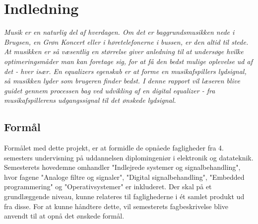 \chapter{Indledning}
\vspace*{0.5 cm}
\emph{Musik er en naturlig del af hverdagen. 
	Om det er baggrundsmusikken nede i Brugsen, en Grøn Koncert eller i høretelefonerne i bussen, er den altid til stede. 
	At musikken er så væsentlig en størrelse giver anledning til at undersøge hvilke optimeringsmåder man kan foretage sig, for at få den bedst mulige oplevelse ud af det - hver især. 
	En equalizers egenskab er at forme en musikafspillers lydsignal, så musikken lyder som brugeren finder bedst. 
	I denne rapport vil læseren blive guidet gennem processen bag ved udvikling af en digital equalizer - fra musikafspillerens udgangssignal til det ønskede lydsignal.}

\section{Formål}
%
%
Formålet med dette projekt, er at formidle de opnåede fagligheder fra 4. semesters undervisning på uddannelsen diplomingeniør i elektronik og datateknik. Semesterets hovedemne omhandler "Indlejrede systemer og signalbehandling", hvor fagene "Analoge filtre og signaler", "Digital signalbehandling", "Embedded programmering" og "Operativsystemer" er inkluderet. Der skal på et grundlæggende niveau, kunne relateres til faglighederne i ét samlet produkt ud fra disse. For at kunne håndtere dette, vil semesterets fagbeskrivelse blive anvendt til at opnå det ønskede formål.


